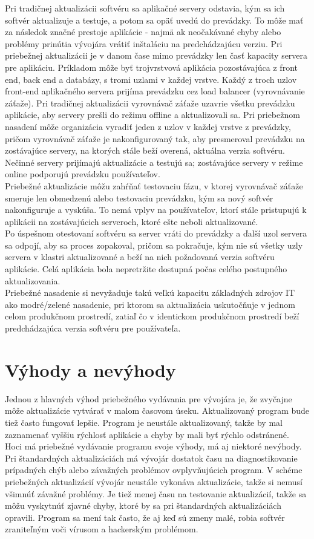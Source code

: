 \documentclass[12pt, a4paper, twoside]{article}
\begin{document}
	Pri tradičnej aktualizácii softvéru sa aplikačné servery odstavia, kým sa ich softvér aktualizuje a testuje, a potom sa opäť uvedú do prevádzky. To môže mať za následok značné prestoje aplikácie - najmä ak neočakávané chyby alebo problémy prinútia vývojára vrátiť inštaláciu na predchádzajúcu verziu. Pri priebežnej aktualizácii je v danom čase mimo prevádzky len časť kapacity servera pre aplikáciu. Príkladom môže byť trojvrstvová aplikácia pozostávajúca z front end, back end a databázy,  s tromi uzlami v každej vrstve. Každý z troch uzlov front-end aplikačného servera prijíma prevádzku cez load balancer (vyrovnávanie záťaže). Pri tradičnej aktualizácii vyrovnávač záťaže uzavrie všetku prevádzku aplikácie, aby servery prešli do režimu offline a aktualizovali sa. Pri priebežnom nasadení môže organizácia vyradiť jeden z uzlov v každej vrstve z prevádzky, pričom vyrovnávač záťaže je nakonfigurovaný tak, aby presmeroval prevádzku na zostávajúce servery, na ktorých stále beží overená, aktuálna verzia softvéru. Nečinné servery prijímajú aktualizácie a testujú sa; zostávajúce servery v režime online podporujú prevádzku používateľov.\\
	Priebežné aktualizácie môžu zahŕňať testovaciu fázu, v ktorej vyrovnávač záťaže smeruje len obmedzenú alebo testovaciu prevádzku, kým sa nový softvér nakonfiguruje a vyskúša. To nemá vplyv na  používateľov, ktorí stále pristupujú k aplikácii na zostávajúcich serveroch, ktoré ešte neboli aktualizované.\\
Po úspešnom otestovaní softvéru sa server vráti do prevádzky a ďalší uzol servera sa odpojí, aby sa proces zopakoval, pričom sa pokračuje, kým nie sú všetky uzly servera v klastri aktualizované a beží na nich požadovaná verzia softvéru aplikácie. Celá aplikácia bola nepretržite dostupná počas celého postupného aktualizovania.\\
	Priebežné nasadenie si nevyžaduje takú veľkú kapacitu základných zdrojov IT ako modré/zelené nasadenie, pri ktorom sa aktualizácia uskutočňuje v jednom celom produkčnom prostredí, zatiaľ čo v identickom produkčnom prostredí beží predchádzajúca verzia softvéru pre používateľa.

\section{Výhody a nevýhody}
	Jednou z hlavných výhod priebežného vydávania pre vývojára je, že zvyčajne môže aktualizácie vytvárať v malom časovom úseku. Aktualizovaný program bude tiež často fungovať lepšie. Program je neustále aktualizovaný, takže by mal zaznamenať vyššiu rýchlosť aplikácie a chyby by mali byť rýchlo odstránené.\\
	Hoci má priebežné vydávanie programu svoje výhody, má aj niektoré nevýhody. Pri štandardných aktualizáciách má vývojár dostatok času na diagnostikovanie prípadných chýb alebo závažných problémov ovplyvňujúcich program. V schéme priebežných aktualizácií vývojár neustále vykonáva aktualizácie, takže si nemusí všimnúť závažné problémy. Je tiež menej času na testovanie aktualizácií, takže sa môžu vyskytnúť zjavné chyby, ktoré by sa pri štandardných aktualizáciách opravili. Program sa mení tak často, že aj keď sú zmeny malé, robia softvér zraniteľným voči vírusom a hackerským problémom.
\end{document}
